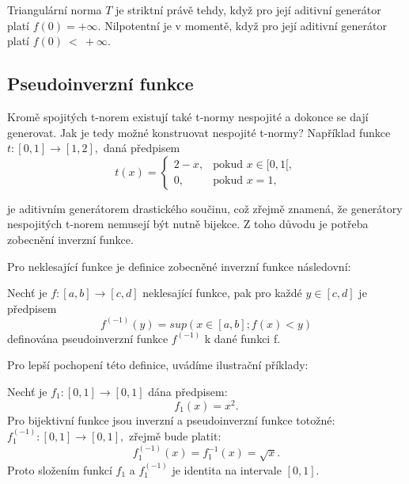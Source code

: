 \begin{remark}
    Triangul\'arn\'i norma $T$ je striktní právě tehdy, když pro její aditivní generátor platí $f(0) = +\infty$. Nilpotentní je v momentě, když pro  její aditivní generátor platí $f(0)~<~+\infty$.
\end{remark}
\subsection{Pseudoinverzn\'i funkce}

Krom\v e   spojit\'ych t-norem existuj\'i tak\'e t-normy nespojit\'e a dokonce se daj\'i generovat. Jak je tedy možné konstruovat nespojité t-normy? Například funkce $t: [0,1] \rightarrow [1,2],$ daná předpisem $$t(x)= \begin{cases} 2-x, & \mbox {pokud }x \in [0,1[,
    \\ 0, & \mbox {pokud } x = 1,
    \end{cases}$$
    
    je aditivním generátorem drastického součinu, což zřejmě znamená, že generátory nespojitých t-norem nemusejí být nutně bijekce. Z toho d\r uvodu je potřeba zobecnění inverzní funkce.

      Pro neklesající  funkce je definice zobecn\v en\'e inverzn\'i funkce n\'asledovn\'i:
\begin{definition}
    \cite{hlinena}
    Nech\v t je $f:[a,b] \rightarrow [c,d]$ neklesající funkce, pak pro každé $y \in [c,d]$ je předpisem $$f^{(-1)}(y) = sup(x \in [a,b];f(x)<y)$$
    definována pseudoinverzní funkce $f^{(-1)}$ k dané funkci f.
\end{definition}

Pro lep\v s\'i pochopen\'i t\'eto definice, uv\'ad\'ime ilustra\v cn\'i p\v r\'iklady:

\begin{example} 
    Nech\v t je  $f_1:[0,1] \rightarrow [0,1]$  dána předpisem:
    $$f_1(x)=x^2.$$
   Pro bijektivn\'i funkce jsou inverzn\'i a pseudoinverzn\'i funkce toto\v zn\'e: \newline$f_1^{(-1)}:[0,1] \rightarrow [0,1],$ zřejmě bude platit:
    $$f_1^{(-1)}(x)=f_1^{-1}(x)= \sqrt{x}.$$
    Proto složením funkcí $f_1$ a $f_1^{(-1)}$ je
    identita na intervale $[0,1].$
\end{example} 



